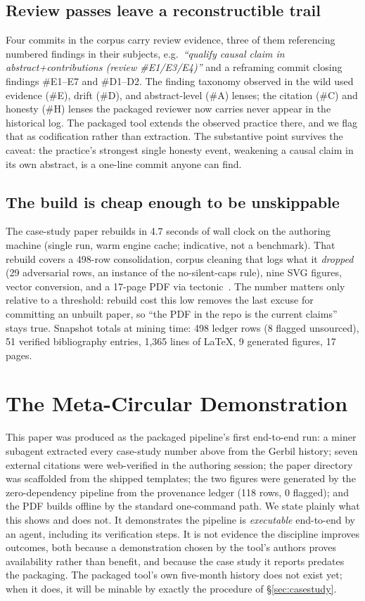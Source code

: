 \documentclass{article}
\begin{document}
\subsection{Review passes leave a reconstructible trail}
Four commits in the corpus carry review evidence, three of them referencing numbered
findings in their subjects, e.g.\ \emph{``qualify causal claim in
abstract+contributions (review \#E1/E3/E4)''} and a reframing commit closing findings
\#E1--E7 and \#D1--D2. The finding taxonomy observed in the wild used evidence (\#E),
drift (\#D), and abstract-level (\#A) lenses; the citation (\#C) and honesty (\#H)
lenses the packaged reviewer now carries never appear in the historical log. The
packaged tool extends the observed practice there, and we flag that as codification
rather than extraction. The substantive point survives the caveat: the practice's
strongest single honesty event, weakening a causal claim in its own abstract, is a
one-line commit anyone can find.

\subsection{The build is cheap enough to be unskippable}
The case-study paper rebuilds in 4.7 seconds of wall clock on the authoring machine
(single run, warm engine cache; indicative, not a benchmark). That rebuild covers a
498-row consolidation, corpus cleaning that logs what it \emph{dropped} (29
adversarial rows, an instance of the no-silent-caps rule), nine SVG figures,
vector conversion, and a 17-page PDF via tectonic~\citep{tectonic}. The number
matters only relative to a threshold: rebuild cost this low removes the last excuse
for committing an unbuilt paper, so ``the PDF in the repo is the current claims''
stays true. Snapshot totals at mining time: 498 ledger rows (8 flagged unsourced),
51 verified bibliography entries, 1{,}365 lines of LaTeX, 9 generated figures, 17
pages.

\section{The Meta-Circular Demonstration}
\label{sec:meta}
This paper was produced as the packaged pipeline's first end-to-end run: a miner
subagent extracted every case-study number above from the Gerbil history; seven
external citations were web-verified in the authoring session; the paper directory
was scaffolded from the shipped templates; the two figures were generated by the
zero-dependency pipeline from the provenance ledger (118 rows, 0 flagged); and the
PDF builds offline by the standard one-command path. We state plainly what this
shows and does not. It demonstrates the pipeline is \emph{executable} end-to-end by
an agent, including its verification steps. It is not evidence the discipline
improves outcomes, both because a demonstration chosen by the tool's authors proves
availability rather than benefit, and because the case study it reports predates the
packaging. The packaged tool's own five-month history does not exist yet; when it
does, it will be minable by exactly the procedure of \S\ref{sec:casestudy}.
\end{document}
